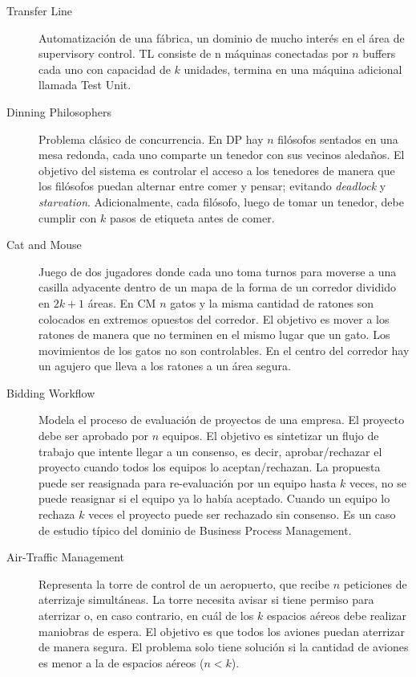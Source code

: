 \begin{description}
    \item [Transfer Line] Automatización de una fábrica, un dominio de mucho interés en el área de supervisory control. TL consiste de n máquinas conectadas por $n$ buffers cada uno con capacidad de $k$ unidades, termina en una máquina adicional llamada Test Unit.
    
    \item [Dinning Philosophers] Problema clásico de concurrencia. En DP hay $n$ filósofos sentados en una mesa redonda, cada uno comparte un tenedor con sus vecinos aledaños. El objetivo del sistema es controlar el acceso a los tenedores de manera que los filósofos puedan alternar entre comer y pensar; evitando \textit{deadlock} y \textit{starvation}. Adicionalmente, cada filósofo, luego de tomar un tenedor, debe cumplir con $k$ pasos de etiqueta antes de comer.

    \item [Cat and Mouse] Juego de dos jugadores donde cada uno toma turnos para moverse a una casilla adyacente dentro de un mapa de la forma de un corredor dividido en $2k + 1$ áreas. En CM $n$ gatos y la misma cantidad de ratones son colocados en extremos opuestos del corredor. El objetivo es mover a los ratones de manera que no terminen en el mismo lugar que un gato. Los movimientos de los gatos no son controlables. En el centro del corredor hay un agujero que lleva a los ratones a un área segura.
    
    \item [Bidding Workflow] Modela el proceso de evaluación de proyectos de una empresa. El proyecto debe ser aprobado por $n$ equipos. El objetivo es sintetizar un flujo de trabajo que intente llegar a un consenso, es decir, aprobar/rechazar el proyecto cuando todos los equipos lo aceptan/rechazan. La propuesta puede ser reasignada para re-evaluación por un equipo hasta $k$ veces, no se puede reasignar si el equipo ya lo había aceptado. Cuando un equipo lo rechaza $k$ veces el proyecto puede ser rechazado sin consenso. Es un caso de estudio típico del dominio de Business Process Management.
    
    \item [Air-Traffic Management] Representa la torre de control de un aeropuerto, que recibe $n$ peticiones de aterrizaje simultáneas. La torre necesita avisar si tiene permiso para aterrizar o, en caso contrario, en cuál de los $k$ espacios aéreos debe realizar maniobras de espera. El objetivo es que todos los aviones puedan aterrizar de manera segura. El problema solo tiene solución si la cantidad de aviones es menor a la de espacios aéreos ($n<k$).
    

\end{description}
